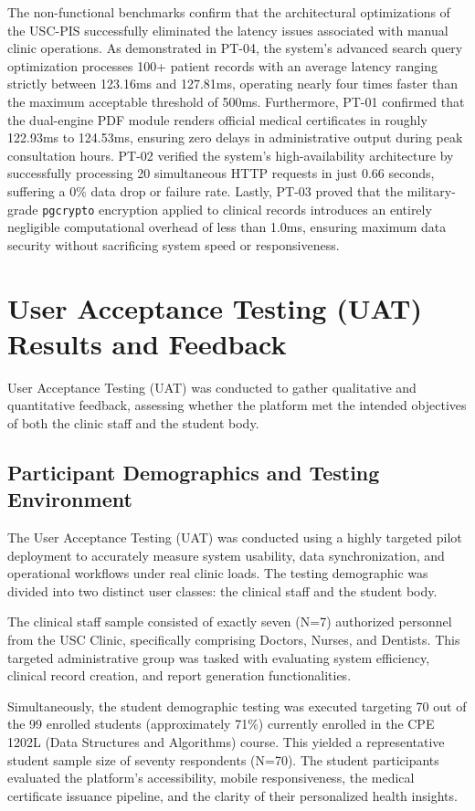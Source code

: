 The non-functional benchmarks confirm that the architectural optimizations of the USC-PIS successfully eliminated the latency issues associated with manual clinic operations. As demonstrated in PT-04, the system's advanced search query optimization processes 100+ patient records with an average latency ranging strictly between 123.16ms and 127.81ms, operating nearly four times faster than the maximum acceptable threshold of 500ms. Furthermore, PT-01 confirmed that the dual-engine PDF module renders official medical certificates in roughly 122.93ms to 124.53ms, ensuring zero delays in administrative output during peak consultation hours. PT-02 verified the system's high-availability architecture by successfully processing 20 simultaneous HTTP requests in just 0.66 seconds, suffering a 0\% data drop or failure rate. Lastly, PT-03 proved that the military-grade \texttt{pgcrypto} encryption applied to clinical records introduces an entirely negligible computational overhead of less than 1.0ms, ensuring maximum data security without sacrificing system speed or responsiveness.

\section{User Acceptance Testing (UAT) Results and Feedback}

User Acceptance Testing (UAT) was conducted to gather qualitative and quantitative feedback, assessing whether the platform met the intended objectives of both the clinic staff and the student body.

\subsection{Participant Demographics and Testing Environment}
The User Acceptance Testing (UAT) was conducted using a highly targeted pilot deployment to accurately measure system usability, data synchronization, and operational workflows under real clinic loads. The testing demographic was divided into two distinct user classes: the clinical staff and the student body.

The clinical staff sample consisted of exactly seven (N=7) authorized personnel from the USC Clinic, specifically comprising Doctors, Nurses, and Dentists. This targeted administrative group was tasked with evaluating system efficiency, clinical record creation, and report generation functionalities.

Simultaneously, the student demographic testing was executed targeting 70 out of the 99 enrolled students (approximately 71\%) currently enrolled in the CPE 1202L (Data Structures and Algorithms) course. This yielded a representative student sample size of seventy respondents (N=70). The student participants evaluated the platform's accessibility, mobile responsiveness, the medical certificate issuance pipeline, and the clarity of their personalized health insights.

